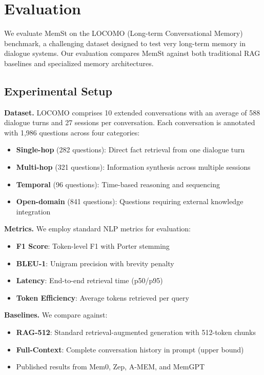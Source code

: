 \section{Evaluation}
\label{sec:evaluation}

We evaluate MemSt on the LOCOMO (Long-term Conversational Memory) benchmark, a challenging dataset designed to test very long-term memory in dialogue systems. Our evaluation compares MemSt against both traditional RAG baselines and specialized memory architectures.

\subsection{Experimental Setup}

\textbf{Dataset.} LOCOMO \citep{maharana2024evaluating} comprises 10 extended conversations with an average of 588 dialogue turns and 27 sessions per conversation. Each conversation is annotated with 1,986 questions across four categories:
\begin{itemize}
    \item \textbf{Single-hop} (282 questions): Direct fact retrieval from one dialogue turn
    \item \textbf{Multi-hop} (321 questions): Information synthesis across multiple sessions
    \item \textbf{Temporal} (96 questions): Time-based reasoning and sequencing
    \item \textbf{Open-domain} (841 questions): Questions requiring external knowledge integration
\end{itemize}

\textbf{Metrics.} We employ standard NLP metrics for evaluation:
\begin{itemize}
    \item \textbf{F1 Score}: Token-level F1 with Porter stemming
    \item \textbf{BLEU-1}: Unigram precision with brevity penalty
    \item \textbf{Latency}: End-to-end retrieval time (p50/p95)
    \item \textbf{Token Efficiency}: Average tokens retrieved per query
\end{itemize}

\textbf{Baselines.} We compare against:
\begin{itemize}
    \item \textbf{RAG-512}: Standard retrieval-augmented generation with 512-token chunks
    \item \textbf{Full-Context}: Complete conversation history in prompt (upper bound)
    \item Published results from Mem0, Zep, A-MEM, and MemGPT
\end{itemize}

